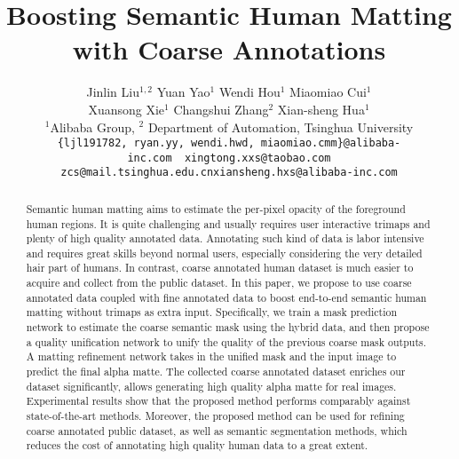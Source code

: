 \documentclass[10pt,twocolumn,letterpaper]{article}
\begin{document}
\title{Boosting Semantic Human Matting with Coarse Annotations}



\author{Jinlin Liu$^{1,2}$ \qquad  Yuan Yao$^{1}$ \qquad  Wendi Hou$^1$ \qquad  Miaomiao Cui$^1$ \vspace{-10pt}\\
 Xuansong Xie$^1$  \qquad  Changshui Zhang$^2$ \qquad Xian-sheng Hua$^{1}$ \vspace{3pt}\\
\normalsize$^1$Alibaba Group, \qquad \normalsize$^2$ Department of Automation, Tsinghua University\\
\tt\small \{ljl191782, ryan.yy, wendi.hwd, miaomiao.cmm\}@alibaba-inc.com~~xingtong.xxs@taobao.com \\
\tt\small zcs@mail.tsinghua.edu.cn\qquad xiansheng.hxs@alibaba-inc.com}







\maketitle
\thispagestyle{empty}
\begin{abstract}
Semantic human matting aims to estimate the per-pixel opacity of the foreground human regions. It is quite challenging and usually requires user interactive trimaps and plenty of high quality annotated data. Annotating such kind of data is labor intensive and requires great skills beyond normal users, especially considering the very detailed hair part of humans. In contrast, coarse annotated human dataset is much easier to acquire and collect from the public dataset. In this paper, we propose to use coarse annotated data coupled with fine annotated data to boost end-to-end semantic human matting without trimaps as extra input. Specifically, we train a mask prediction network to estimate the coarse semantic mask using the hybrid data, and then propose a quality unification network to unify the quality of the previous coarse mask outputs. A matting refinement network takes in the unified mask and the input image to predict the final alpha matte. The collected coarse annotated dataset enriches our dataset significantly, allows generating high quality alpha matte for real images. Experimental results show that the proposed method performs comparably against state-of-the-art methods. Moreover, the proposed method can be used for refining coarse annotated public dataset, as well as semantic segmentation methods, which reduces the cost of annotating high quality human data to a great extent.
\end{abstract}
\end{document}
